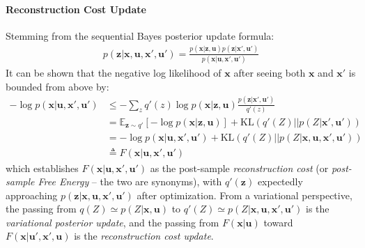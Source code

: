 \documentclass[12pt,twoside,openright]{article}
\begin{document}
\paragraph{Reconstruction Cost Update}
{\color{Purple} Stemming from the sequential Bayes posterior update formula:
	\begin{align} p(\boldsymbol{z}|\boldsymbol{x}, \boldsymbol{u}, \boldsymbol{x}', \boldsymbol{u}') = \frac{p(\boldsymbol{x}|\boldsymbol{z}, \boldsymbol{u})p(\boldsymbol{z}|\boldsymbol{x}', \boldsymbol{u}')}{p(\boldsymbol{x}|\boldsymbol{u},\boldsymbol{x}',\boldsymbol{u}')}
	\end{align} 
}
{\color{Purple} It can be shown that the negative log likelihood of $\boldsymbol{x}$ after seeing both $\boldsymbol{x}$ and $\boldsymbol{x}'$ is  bounded from above by}:
\begin{align}
	-\log p(\boldsymbol{x}| \boldsymbol{u}, \boldsymbol{x}', \boldsymbol{u}') 
	&\leq - \sum_z q'(z) \log p(\boldsymbol{x}| \boldsymbol{z}, \boldsymbol{u}) \frac{p(\boldsymbol{z} |\boldsymbol{x}', \boldsymbol{u}')} {q'(z)}  \nonumber\\
	&= \mathbb{E}_{\boldsymbol{z} \sim q'} \left[-\log p(\boldsymbol{x}| \boldsymbol{z}, \boldsymbol{u})\right] + \text{KL}(q'(Z)||p(Z|\boldsymbol{x}',\boldsymbol{u}'))
	\label{eq:FEP-uxu}\\
	&=  -\log p(\boldsymbol{x}| \boldsymbol{u}, \boldsymbol{x}',\boldsymbol{u}') + \text{KL}(q'(Z)||p(Z|\boldsymbol{x},\boldsymbol{u},\boldsymbol{x}',\boldsymbol{u}'))
	\label{eq:FEP-uxu2}\\
	&\triangleq F(\boldsymbol{x}|\boldsymbol{u}, \boldsymbol{x}', \boldsymbol{u}')\nonumber
\end{align}
which establishes $F(\boldsymbol{x}|\boldsymbol{u}, \boldsymbol{x}', \boldsymbol{u}')$ as the post-sample \emph{reconstruction cost} {\color{Purple} (or \emph{post-sample Free Energy} -- the two are synonyms)}, with $q'(\boldsymbol{z})$ expectedly approaching  $p(\boldsymbol{z}|\boldsymbol{x}, \boldsymbol{u}, \boldsymbol{x}', \boldsymbol{u}')$ after optimization.
From a variational perspective, the passing from $q(Z) \simeq p(Z|\boldsymbol{x}, \boldsymbol{u})$ to $q'(Z) \simeq p(Z|\boldsymbol{x}, \boldsymbol{u}, \boldsymbol{x}', \boldsymbol{u}')$ is the \emph{variational posterior update}, and the passing from $F(\boldsymbol{x}|\boldsymbol{u})$ toward   $F(\boldsymbol{x}|\boldsymbol{u}', \boldsymbol{x}', \boldsymbol{u})$ is the \emph{reconstruction cost update}. 
\end{document}
